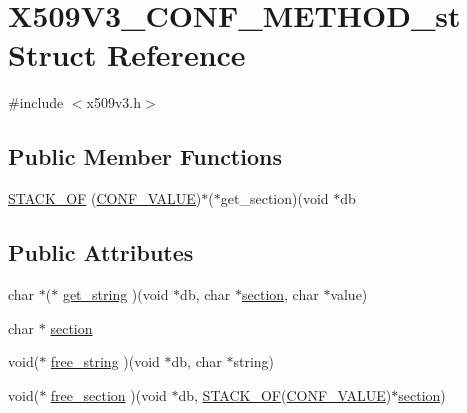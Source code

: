 \hypertarget{struct_x509_v3___c_o_n_f___m_e_t_h_o_d__st}{}\section{X509\+V3\+\_\+\+C\+O\+N\+F\+\_\+\+M\+E\+T\+H\+O\+D\+\_\+st Struct Reference}
\label{struct_x509_v3___c_o_n_f___m_e_t_h_o_d__st}


{\ttfamily \#include $<$x509v3.\+h$>$}

\subsection*{Public Member Functions}
\begin{DoxyCompactItemize}
\item 
\hyperlink{struct_x509_v3___c_o_n_f___m_e_t_h_o_d__st_a682410d8863d17e814a12e495c053490}{S\+T\+A\+C\+K\+\_\+\+OF} (\hyperlink{struct_c_o_n_f___v_a_l_u_e}{C\+O\+N\+F\+\_\+\+V\+A\+L\+UE})$\ast$($\ast$get\+\_\+section)(void $\ast$db
\end{DoxyCompactItemize}
\subsection*{Public Attributes}
\begin{DoxyCompactItemize}
\item 
char $\ast$($\ast$ \hyperlink{struct_x509_v3___c_o_n_f___m_e_t_h_o_d__st_a122df56f2ef2704b4362b5767c3571c0}{get\+\_\+string} )(void $\ast$db, char $\ast$\hyperlink{struct_x509_v3___c_o_n_f___m_e_t_h_o_d__st_ac0685c3b398f0093e4d5c44c90259ac4}{section}, char $\ast$value)
\item 
char $\ast$ \hyperlink{struct_x509_v3___c_o_n_f___m_e_t_h_o_d__st_ac0685c3b398f0093e4d5c44c90259ac4}{section}
\item 
void($\ast$ \hyperlink{struct_x509_v3___c_o_n_f___m_e_t_h_o_d__st_aaebdc3bd7c731ad447fc1abb8f4a6bd8}{free\+\_\+string} )(void $\ast$db, char $\ast$string)
\item 
void($\ast$ \hyperlink{struct_x509_v3___c_o_n_f___m_e_t_h_o_d__st_aaaaced3765009180d953ec165a7fc849}{free\+\_\+section} )(void $\ast$db, \hyperlink{struct_x509_v3___c_o_n_f___m_e_t_h_o_d__st_a682410d8863d17e814a12e495c053490}{S\+T\+A\+C\+K\+\_\+\+OF}(\hyperlink{struct_c_o_n_f___v_a_l_u_e}{C\+O\+N\+F\+\_\+\+V\+A\+L\+UE})$\ast$\hyperlink{struct_x509_v3___c_o_n_f___m_e_t_h_o_d__st_ac0685c3b398f0093e4d5c44c90259ac4}{section})
\end{DoxyCompactItemize}


